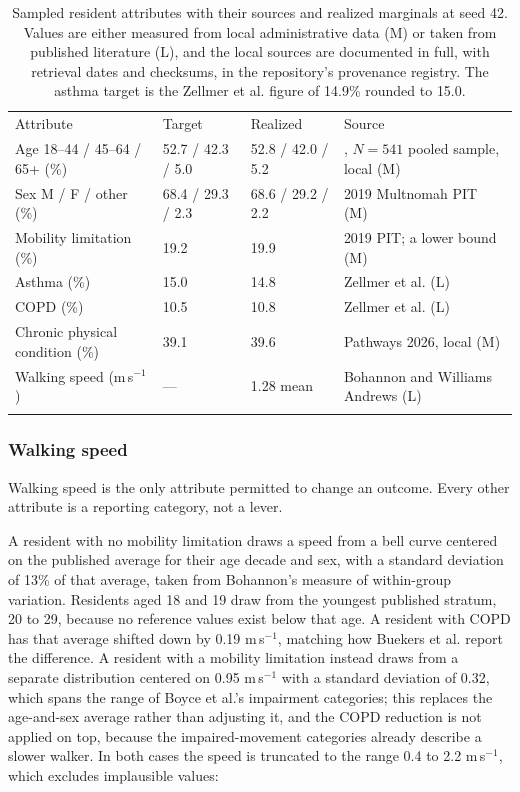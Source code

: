 \documentclass[graybox]{svmult}
\begin{document}
\begin{table}[t]
\caption{Sampled resident attributes with their sources and realized marginals at
seed 42. Values are either measured from local administrative data (M) or taken
from published literature (L), and the local sources are documented in full, with
retrieval dates and checksums, in the repository's provenance registry. The
asthma target is the Zellmer et al. figure of 14.9\% rounded to 15.0.}
\label{tab:attributes}
\begin{tabular}{p{2.5cm}p{2.3cm}p{2.3cm}p{2.8cm}}
\hline\noalign{\smallskip}
Attribute & Target & Realized & Source \\
\noalign{\smallskip}\svhline\noalign{\smallskip}
Age 18--44 / 45--64 / 65+ (\%) & 52.7 / 42.3 / 5.0 & 52.8 / 42.0 / 5.2 & \cite{conte2026}, $N = 541$ pooled sample, local (M) \\
Sex M / F / other (\%) & 68.4 / 29.3 / 2.3 & 68.6 / 29.2 / 2.2 & 2019 Multnomah PIT (M) \\
Mobility limitation (\%) & 19.2 & 19.9 & 2019 PIT; a lower bound (M) \\
Asthma (\%) & 15.0 & 14.8 & Zellmer et al. \cite{zellmer2025} (L) \\
COPD (\%) & 10.5 & 10.8 & Zellmer et al. \cite{zellmer2025} (L) \\
Chronic physical condition (\%) & 39.1 & 39.6 & Pathways 2026, local (M) \\
Walking speed (m\,s$^{-1}$) & --- & 1.28 mean & Bohannon and Williams Andrews \cite{bohannon2011} (L) \\
\noalign{\smallskip}\hline
\end{tabular}
\end{table}

\subsubsection{Walking speed}
\label{sec:speed}

Walking speed is the only attribute permitted to change an outcome. Every other
attribute is a reporting category, not a lever.

A resident with no mobility limitation draws a speed from a bell curve centered
on the published average for their age decade and sex, with a standard deviation
of 13\% of that average, taken from Bohannon's measure of within-group variation.
Residents aged 18 and 19 draw from the youngest published stratum, 20 to 29,
because no reference values exist below that age. A resident with COPD has that
average shifted down by 0.19 m\,s$^{-1}$, matching how Buekers et al. report the
difference. A resident with a mobility limitation instead draws from a separate
distribution centered on 0.95 m\,s$^{-1}$ with a standard deviation of 0.32,
which spans the range of Boyce et al.'s impairment categories; this replaces the
age-and-sex average rather than adjusting it, and the COPD reduction is not
applied on top, because the impaired-movement categories already describe a
slower walker. In both cases the speed is truncated to the range 0.4 to 2.2
m\,s$^{-1}$, which excludes implausible values:
\end{document}
